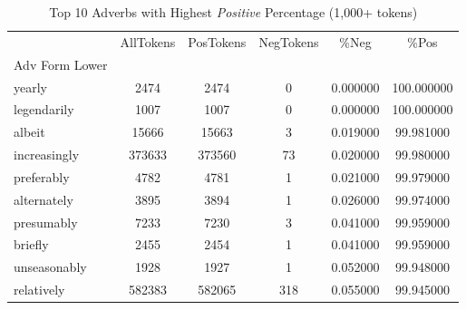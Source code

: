 

\singlespacing
\scriptsize\noindent
\begin{table}
\centering
\caption{Top 10 Adverbs with Highest \textit{Positive} Percentage (1,000+ tokens)}
\label{tab:top10-adv-PosPercent}
\begin{tabular}{*{1}{l}S[table-auto-round, table-format=7.2, drop-zero-decimal]
    S[table-auto-round, table-format=7.2, drop-zero-decimal]
    S[table-auto-round, table-format=7.2, drop-zero-decimal]
    S[table-auto-round, table-format=7.2, drop-zero-decimal]
    S[table-auto-round, table-format=7.2, drop-zero-decimal]}
\toprule
{} & {AllTokens} & {PosTokens} & {NegTokens} & {\%Neg} & {\%Pos} \\
{Adv Form Lower} & {} & {} & {} & {} & {} \\
\midrule
yearly & 2474 & 2474 & 0 & 0.000000 & 100.000000 \\
legendarily & 1007 & 1007 & 0 & 0.000000 & 100.000000 \\
albeit & 15666 & 15663 & 3 & 0.019000 & 99.981000 \\
increasingly & 373633 & 373560 & 73 & 0.020000 & 99.980000 \\
preferably & 4782 & 4781 & 1 & 0.021000 & 99.979000 \\
alternately & 3895 & 3894 & 1 & 0.026000 & 99.974000 \\
presumably & 7233 & 7230 & 3 & 0.041000 & 99.959000 \\
briefly & 2455 & 2454 & 1 & 0.041000 & 99.959000 \\
unseasonably & 1928 & 1927 & 1 & 0.052000 & 99.948000 \\
relatively & 582383 & 582065 & 318 & 0.055000 & 99.945000 \\
\bottomrule
\end{tabular}
\end{table}

\normalsize
\normalspacing